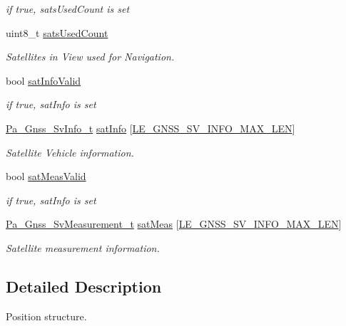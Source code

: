 \begin{DoxyCompactItemize}
\begin{DoxyCompactList}\small\item\em if true, sats\+Used\+Count is set \end{DoxyCompactList}\item 
uint8\+\_\+t \hyperlink{structpa___gnss___position__t_a3efe9ffc9992f92386c45b9b3f362e7e}{sats\+Used\+Count}
\begin{DoxyCompactList}\small\item\em Satellites in View used for Navigation. \end{DoxyCompactList}\item 
bool \hyperlink{structpa___gnss___position__t_a892f296b0ad142ab76f7abcabcf3b478}{sat\+Info\+Valid}
\begin{DoxyCompactList}\small\item\em if true, sat\+Info is set \end{DoxyCompactList}\item 
\hyperlink{struct_pa___gnss___sv_info__t}{Pa\+\_\+\+Gnss\+\_\+\+Sv\+Info\+\_\+t} \hyperlink{structpa___gnss___position__t_a70397aee152ea46265e9ec805e716c88}{sat\+Info} \mbox{[}\hyperlink{le__gnss__interface_8h_a507cc757f9629ad56d7a0767c0356e76}{L\+E\+\_\+\+G\+N\+S\+S\+\_\+\+S\+V\+\_\+\+I\+N\+F\+O\+\_\+\+M\+A\+X\+\_\+\+L\+EN}\mbox{]}
\begin{DoxyCompactList}\small\item\em Satellite Vehicle information. \end{DoxyCompactList}\item 
bool \hyperlink{structpa___gnss___position__t_a169782222d770cae29bff8fd4d6f8fbb}{sat\+Meas\+Valid}
\begin{DoxyCompactList}\small\item\em if true, sat\+Info is set \end{DoxyCompactList}\item 
\hyperlink{struct_pa___gnss___sv_measurement__t}{Pa\+\_\+\+Gnss\+\_\+\+Sv\+Measurement\+\_\+t} \hyperlink{structpa___gnss___position__t_a06222987fe8539f563063838ec084c25}{sat\+Meas} \mbox{[}\hyperlink{le__gnss__interface_8h_a507cc757f9629ad56d7a0767c0356e76}{L\+E\+\_\+\+G\+N\+S\+S\+\_\+\+S\+V\+\_\+\+I\+N\+F\+O\+\_\+\+M\+A\+X\+\_\+\+L\+EN}\mbox{]}
\begin{DoxyCompactList}\small\item\em Satellite measurement information. \end{DoxyCompactList}\end{DoxyCompactItemize}


\subsection{Detailed Description}
Position structure. 

